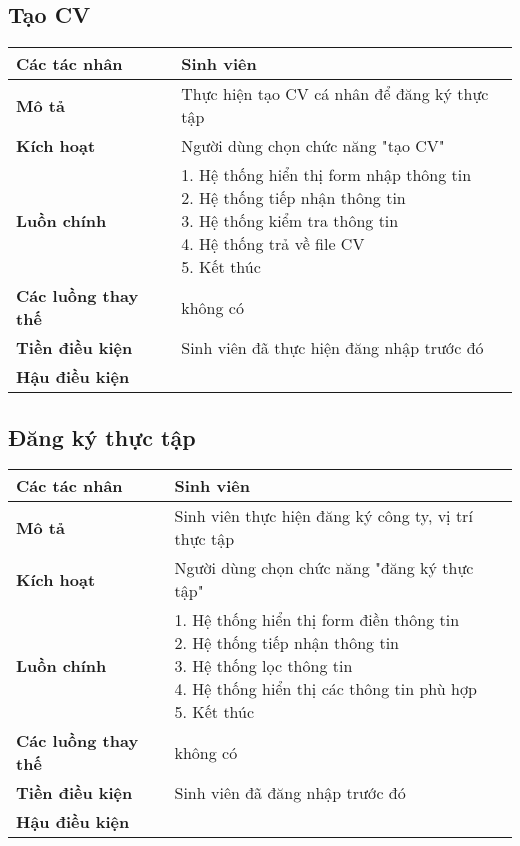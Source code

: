 	\subsection*{Tạo CV}
	\begin{tabular}{|l|p{}|}
		\hline
		\textbf{Các tác nhân}         & Sinh viên                                             \\
		\hline
		\textbf{Mô tả}                & Thực hiện tạo CV cá nhân để đăng ký thực tập          \\
		\hline
		\textbf{Kích hoạt}            & Người dùng chọn chức năng "tạo CV"                    \\
		\hline
		\textbf{Luồn chính}           & \makecell[l]{1. Hệ thống hiển thị form nhập thông tin \\ 2. Hệ thống tiếp nhận thông tin \\ 3. Hệ thống kiểm tra thông tin \\ 4. Hệ thống trả về file CV \\ 5. Kết thúc} \\
		\hline
		\textbf{Các luồng thay thế}   & không có                                              \\
		\hline
		\textbf{Tiền điều kiện}       & Sinh viên đã thực hiện đăng nhập trước đó             \\
		\hline
		\textbf{Hậu điều kiện}        &                                                       \\
		\hline
	\end{tabular}

	\subsection*{Đăng ký thực tập}
	\begin{tabular}{|l|p{}|}
		\hline
		\textbf{Các tác nhân}         & Sinh viên                                             \\
		\hline
		\textbf{Mô tả}                & Sinh viên thực hiện đăng ký công ty, vị trí thực tập  \\
		\hline
		\textbf{Kích hoạt}            & Người dùng chọn chức năng "đăng ký thực tập"          \\
		\hline
		\textbf{Luồn chính}           & \makecell[l]{1. Hệ thống hiển thị form điền thông tin \\ 2. Hệ thống tiếp nhận thông tin \\ 3. Hệ thống lọc thông tin \\ 4. Hệ thống hiển thị các thông tin phù hợp \\ 5. Kết thúc} \\
		\hline
		\textbf{Các luồng thay thế}   & không có                                              \\
		\hline
		\textbf{Tiền điều kiện}       & Sinh viên đã đăng nhập trước đó                       \\
		\hline
		\textbf{Hậu điều kiện}        &                                                       \\
		\hline
	\end{tabular}
